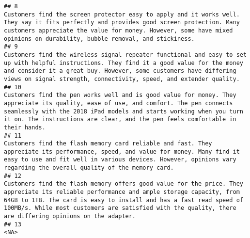 \documentclass[
]{article}
\begin{document}
\begin{verbatim}
## 8                                                                                                                                                                                                                    Customers find the screen protector easy to apply and it works well. They say it fits perfectly and provides good screen protection. Many customers appreciate the value for money. However, some have mixed opinions on durability, bubble removal, and stickiness.
## 9                                                                                                                                                                                                   Customers find the wireless signal repeater functional and easy to set up with helpful instructions. They find it a good value for the money and consider it a great buy. However, some customers have differing views on signal strength, connectivity, speed, and extender quality.
## 10                                                                                                                                                                                          Customers find the pen works well and is good value for money. They appreciate its quality, ease of use, and comfort. The pen connects seamlessly with the 2018 iPad models and starts working when you turn it on. The instructions are clear, and the pen feels comfortable in their hands.
## 11                                                                                                                                                                                                                                Customers find the flash memory card reliable and fast. They appreciate its performance, speed, and value for money. Many find it easy to use and fit well in various devices. However, opinions vary regarding the overall quality of the memory card.
## 12                                                                                                                                                            Customers find the flash memory offers good value for the price. They appreciate its reliable performance and ample storage capacity, from 64GB to 1TB. The card is easy to install and has a fast read speed of 100MB/s. While most customers are satisfied with the quality, there are differing opinions on the adapter.
## 13                                                                                                                                                                                                                                                                                                                                                                                                                                                                                   <NA>

\end{verbatim}
\end{document}
